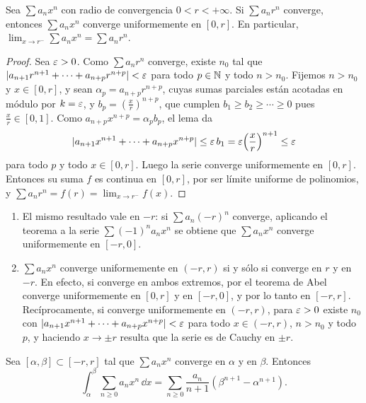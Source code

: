 \begin{theorem}[Abel]
  Sea \(\sum a_n x^n\) con radio de convergencia \(0 < r < +\infty\). Si \(\sum a_n r^n\) converge, entonces \(\sum a_n x^n\) converge uniformemente en \([0, r]\). En particular, \(\lim_{x \to r^{-}} \sum a_n x^n = \sum a_n r^n\).
\end{theorem}

\begin{proof}
  Sea \(\varepsilon > 0\). Como \(\sum a_n r^n\) converge, existe \(n_0\) tal que \(|a_{n+1} r^{n+1} + \cdots + a_{n+p} r^{n+p}| < \varepsilon\) para todo \(p \in \mathbb{N}\) y todo \(n > n_0\). Fijemos \(n > n_0\) y \(x \in [0, r]\), y sean \(\alpha_p = a_{n+p} r^{n+p}\), cuyas sumas parciales están acotadas en módulo por \(k = \varepsilon\), y \(b_p = {\left( \frac{x}{r} \right)}^{n+p}\), que cumplen \(b_1 \geq b_2 \geq \cdots \geq 0\) pues \(\frac{x}{r} \in [0, 1]\). Como \(a_{n+p} x^{n+p} = \alpha_p b_p\), el lema da
  \[
    |a_{n+1} x^{n+1} + \cdots + a_{n+p} x^{n+p}| \leq \varepsilon \, b_1 = \varepsilon {\left( \frac{x}{r} \right)}^{n+1} \leq \varepsilon
  \]
  para todo \(p\) y todo \(x \in [0, r]\). Luego la serie converge uniformemente en \([0, r]\). Entonces su suma \(f\) es continua en \([0, r]\), por ser límite uniforme de polinomios, y \(\sum a_n r^n = f(r) = \lim_{x \to r^{-}} f(x)\).
\end{proof}

\begin{note}
  \begin{enumerate}[label=(\arabic*)]
    \item El mismo resultado vale en \(-r\): si \(\sum a_n {(-r)}^n\) converge, aplicando el teorema a la serie \(\sum {(-1)}^n a_n x^n\) se obtiene que \(\sum a_n x^n\) converge uniformemente en \([-r, 0]\).
    \item \(\sum a_n x^n\) converge uniformemente en \((-r, r)\) si y sólo si converge en \(r\) y en \(-r\). En efecto, si converge en ambos extremos, por el teorema de Abel converge uniformemente en \([0, r]\) y en \([-r, 0]\), y por lo tanto en \([-r, r]\). Recíprocamente, si converge uniformemente en \((-r, r)\), para \(\varepsilon > 0\) existe \(n_0\) con \(|a_{n+1} x^{n+1} + \cdots + a_{n+p} x^{n+p}| < \varepsilon\) para todo \(x \in (-r, r)\), \(n > n_0\) y todo \(p\), y haciendo \(x \to \pm r\) resulta que la serie es de Cauchy en \(\pm r\).
  \end{enumerate}
\end{note}

\begin{theorem}
  Sea \([\alpha, \beta] \subset [-r, r]\) tal que \(\sum a_n x^n\) converge en \(\alpha\) y en \(\beta\). Entonces
  \[
    \int_{\alpha}^{\beta} \sum_{n \geq 0} a_n x^n \,\dd x = \sum_{n \geq 0} \frac{a_n}{n + 1} \left( \beta^{n+1} - \alpha^{n+1} \right).
  \]
\end{theorem}

